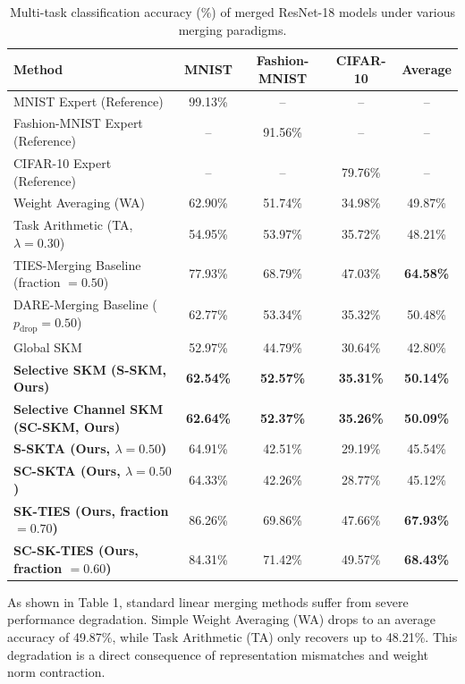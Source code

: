 \documentclass{article}
\begin{document}
\begin{table}[t]
\caption{Multi-task classification accuracy (\%) of merged ResNet-18 models under various merging paradigms.}
\label{table:acc}
\vskip 0.15in
\begin{center}
\begin{small}
\begin{tabular}{lcccc}
\toprule
\textbf{Method} & \textbf{MNIST} & \textbf{Fashion-MNIST} & \textbf{CIFAR-10} & \textbf{Average} \\
\midrule
MNIST Expert (Reference) & 99.13\% & -- & -- & -- \\
Fashion-MNIST Expert (Reference) & -- & 91.56\% & -- & -- \\
CIFAR-10 Expert (Reference) & -- & -- & 79.76\% & -- \\
\midrule
Weight Averaging (WA) & 62.90\% & 51.74\% & 34.98\% & 49.87\% \\
Task Arithmetic (TA, $\lambda = 0.30$) & 54.95\% & 53.97\% & 35.72\% & 48.21\% \\
TIES-Merging Baseline (fraction $= 0.50$) & 77.93\% & 68.79\% & 47.03\% & \textbf{64.58\%} \\
DARE-Merging Baseline ($p_{\text{drop}} = 0.50$) & 62.77\% & 53.34\% & 35.32\% & 50.48\% \\
\midrule
Global SKM & 52.97\% & 44.79\% & 30.64\% & 42.80\% \\
\textbf{Selective SKM (S-SKM, Ours)} & \textbf{62.54\%} & \textbf{52.57\%} & \textbf{35.31\%} & \textbf{50.14\%} \\
\textbf{Selective Channel SKM (SC-SKM, Ours)} & \textbf{62.64\%} & \textbf{52.37\%} & \textbf{35.26\%} & \textbf{50.09\%} \\
\textbf{S-SKTA (Ours, $\lambda = 0.50$)} & 64.91\% & 42.51\% & 29.19\% & 45.54\% \\
\textbf{SC-SKTA (Ours, $\lambda = 0.50$)} & 64.33\% & 42.26\% & 28.77\% & 45.12\% \\
\textbf{SK-TIES (Ours, fraction $= 0.70$)} & 86.26\% & 69.86\% & 47.66\% & \textbf{67.93\%} \\
\textbf{SC-SK-TIES (Ours, fraction $= 0.60$)} & 84.31\% & 71.42\% & 49.57\% & \textbf{68.43\%} \\
\bottomrule
\end{tabular}
\end{small}
\end{center}
\vskip -0.1in
\end{table}

As shown in Table 1, standard linear merging methods suffer from severe performance degradation. Simple Weight Averaging (WA) drops to an average accuracy of 49.87\%, while Task Arithmetic (TA) only recovers up to 48.21\%. This degradation is a direct consequence of representation mismatches and weight norm contraction.
\end{document}
